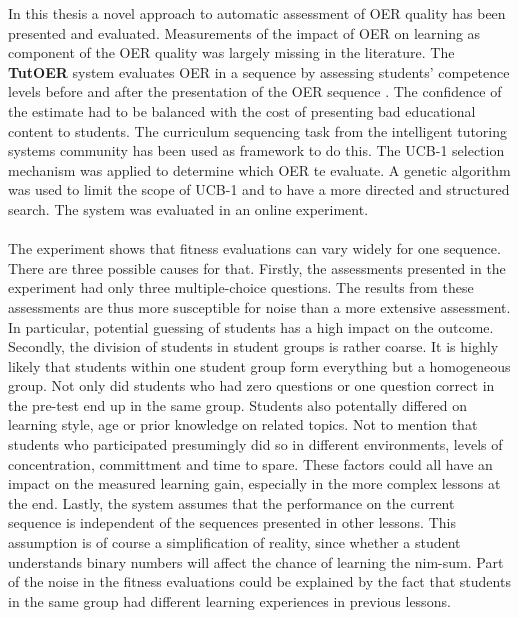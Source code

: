 
In this thesis a novel approach to automatic assessment of OER quality has been
presented and evaluated. Measurements of the impact of OER on learning as
component of the OER quality was largely missing in the literature. The
\textbf{TutOER} system evaluates OER in a sequence by assessing students' competence levels
before and after the presentation of the OER sequence . The confidence of the estimate
had to be balanced with the cost of presenting bad educational content to
students. The curriculum sequencing task from the intelligent tutoring systems
community has been used as framework to do this. The UCB-1 selection mechanism
was applied to determine which OER te evaluate. A genetic algorithm was used
to limit the scope of UCB-1 and to have a more directed and structured
search. The system was evaluated in an online experiment.\\\\
\noindent
The experiment shows that fitness evaluations can vary widely for one
sequence. There are three possible causes for that. Firstly, the assessments
presented in the experiment had only three multiple-choice questions. The
results from these assessments are thus more susceptible for noise than a more
extensive assessment. In particular, potential guessing of students has a high
impact on the outcome. Secondly, the division of students in student groups is
rather coarse. It is highly likely that students within one student group form
everything but a homogeneous group. Not only did students who had zero
questions or one question correct in the pre-test end up in the same group.
Students also potentally differed on learning style, age or prior knowledge on
related topics. Not to mention that students who participated presumingly did
so in different environments, levels of concentration, committment and time to
spare. These factors could all have an impact on the measured learning gain,
especially in the more complex lessons at the end. Lastly, the system assumes
that the performance on the current sequence is independent of the sequences
presented in other lessons. This assumption is of course a simplification of
reality, since whether a student understands binary numbers will affect the
chance of learning the nim-sum. Part of the noise in the fitness evaluations
could be explained by the fact that students in the same group had different
learning experiences in previous lessons.\\\\
